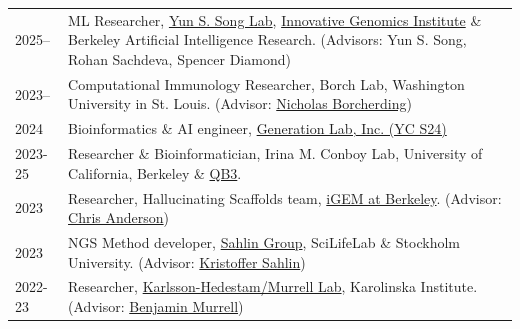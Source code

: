 \renewcommand{\arraystretch}{1.3}
\begin{longtable}[l]{@{}p{} p{}}

    2025-- & ML Researcher, \href{https://people.eecs.berkeley.edu/~yss/}{Yun S. Song Lab}, \href{https://innovativegenomics.org/people/yun-s-song/}{Innovative Genomics Institute} \& Berkeley Artificial Intelligence Research. (Advisors: Yun S. Song, Rohan Sachdeva, Spencer Diamond) \\


    2023-- & Computational Immunology Researcher, Borch Lab, Washington University in St. Louis. (Advisor: \href{https://www.borch.dev/}{Nicholas Borcherding}) \\

    2024 & Bioinformatics \& AI engineer, \href{https://www.generationlab.com/}{Generation Lab, Inc. (YC S24)} \\

    2023-25 & Researcher \& Bioinformatician, Irina M. Conboy Lab, University of California, Berkeley \& \href{https://qb3.berkeley.edu/}{QB3}. \\

    2023 & Researcher, Hallucinating Scaffolds team, \href{https://igem.studentorg.berkeley.edu/teams/hallucinating-scaffolds/}{iGEM at Berkeley}. (Advisor: \href{https://vcresearch.berkeley.edu/faculty/chris-anderson}{Chris Anderson}) \\

    2023 & NGS Method developer, \href{https://sahlingroup.github.io/}{Sahlin Group}, SciLifeLab \& Stockholm University. (Advisor: \href{https://www.scilifelab.se/researchers/kristoffer-sahlin/}{Kristoffer Sahlin}) \\

    2022-23 & Researcher, \href{https://ki.se/en/people/benjamin-murrell}{Karlsson-Hedestam/Murrell Lab}, Karolinska Institute. (Advisor: \href{https://ki.se/en/people/benjamin-murrell}{Benjamin Murrell})

\end{longtable}
\renewcommand{\arraystretch}{1}
